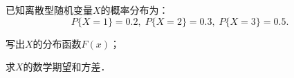 \documentclass[plain,noanswer,medmath]{../../template/jnuexam}
\begin{document}
%



%



%



\begin{problem}
已知离散型随机变量$X$的概率分布为：
$$P\{X=1\} = 0.2,\; P\{X=2\} = 0.3,\; P\{X=3\} = 0.5.$$
\begin{enumerate*}
\item 写出$X$的分布函数$F(x)$；
\item 求$X$的数学期望和方差．
\end{enumerate*}
\end{problem}



%
\end{document}
